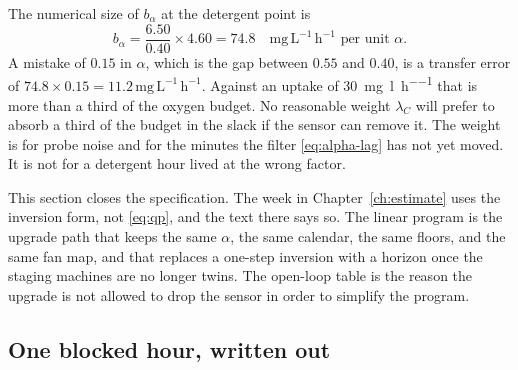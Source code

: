 The numerical size of $b_{\alpha}$ at the detergent point is
\begin{equation}
b_{\alpha}
=
\frac{6.50}{0.40}\times 4.60
=
74.8
\quad
\mathrm{mg\,L^{-1}\,h^{-1}}
\text{ per unit $\alpha$}.
\end{equation}
A mistake of $0.15$ in $\alpha$, which is the gap between $0.55$ and $0.40$, is a transfer error of $74.8\times 0.15=11.2\,\mathrm{mg\,L^{-1}\,h^{-1}}$. Against an uptake of \SI{30}{\milli\gram\per\litre\per\hour} that is more than a third of the oxygen budget. No reasonable weight $\lambda_{C}$ will prefer to absorb a third of the budget in the slack if the sensor can remove it. The weight is for probe noise and for the minutes the filter \eqref{eq:alpha-lag} has not yet moved. It is not for a detergent hour lived at the wrong factor.

This section closes the specification. The week in Chapter~\ref{ch:estimate} uses the inversion form, not \eqref{eq:qp}, and the text there says so. The linear program is the upgrade path that keeps the same $\alpha$, the same calendar, the same floors, and the same fan map, and that replaces a one-step inversion with a horizon once the staging machines are no longer twins. The open-loop table is the reason the upgrade is not allowed to drop the sensor in order to simplify the program.

\subsection{One blocked hour, written out}

